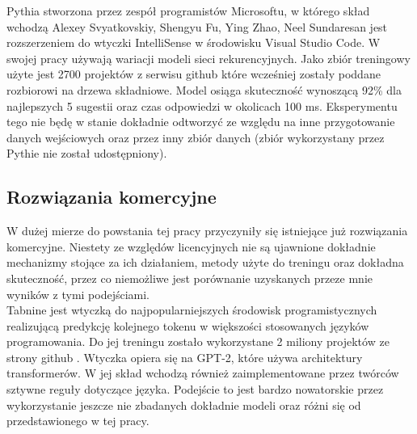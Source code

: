 Pythia \cite{pythia} stworzona przez zespół programistów Microsoftu, w którego skład wchodzą Alexey Svyatkovskiy, Shengyu Fu, Ying Zhao, Neel Sundaresan
jest rozszerzeniem do wtyczki IntelliSense w środowisku Visual Studio Code. W swojej pracy używają wariacji modeli sieci rekurencyjnych.
Jako zbiór treningowy użyte jest 2700 projektów z serwisu github \cite{github}
które wcześniej zostały poddane rozbiorowi na drzewa składniowe. Model osiąga skuteczność wynoszącą
92\% dla najlepszych 5 sugestii oraz czas odpowiedzi w okolicach 100 ms. Eksperymentu tego nie będę w stanie 
dokładnie odtworzyć ze względu na inne przygotowanie danych wejściowych oraz przez inny zbiór danych (zbiór wykorzystany przez
Pythie nie został udostępniony). 


\subsection {Rozwiązania komercyjne}
W dużej mierze do powstania tej pracy przyczyniły się istniejące już rozwiązania komercyjne. Niestety 
ze względów licencyjnych nie są ujawnione dokładnie mechanizmy stojące za ich działaniem, metody użyte 
do treningu oraz dokładna skuteczność, przez co niemożliwe jest porównanie uzyskanych przeze mnie wyników 
z tymi podejściami. \\

Tabnine \cite{tabnine} jest wtyczką do najpopularniejszych środowisk programistycznych realizującą predykcję kolejnego tokenu w 
większości stosowanych języków programowania. Do jej treningu zostało wykorzystane 2 miliony projektów ze strony github \cite{github}. 
Wtyczka opiera się na GPT-2, które używa architektury transformerów. W jej skład wchodzą również zaimplementowane przez twórców
sztywne reguły dotyczące języka. Podejście to jest bardzo nowatorskie przez wykorzystanie jeszcze nie zbadanych dokładnie modeli oraz 
różni się od przedstawionego w tej pracy.\\

